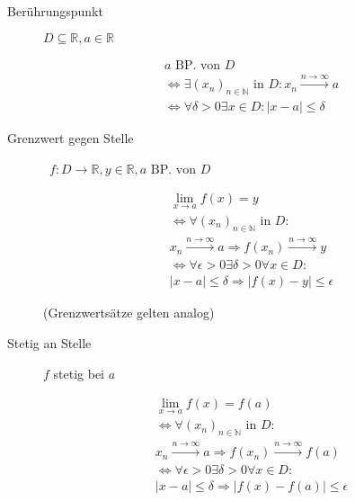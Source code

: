 \begin{description}
  \item [Berührungspunkt]
        $D \subseteq \mathbb{R}, a \in \mathbb{R}$

        \begin{gather*}
          a \text{ BP. von } D \\
          \Leftrightarrow \exists (x_n)_{n \in \mathbb{N}} \text{ in } D: x_n \xrightarrow{n \rightarrow \infty} a \\
          \Leftrightarrow \forall \delta > 0 \exists x \in D: |x - a| \leq \delta
        \end{gather*}

  \item [Grenzwert gegen Stelle]
        \
        $f: D \rightarrow \mathbb{R}, y \in \mathbb{R}, a \text{ BP. von } D$

        \begin{gather*}
          \lim_{x \rightarrow a} f(x) = y \\
          \Leftrightarrow \forall (x_n)_{n \in \mathbb{N}} \text{ in } D: \\ x_n \xrightarrow{n \rightarrow \infty} a \Rightarrow f(x_n) \xrightarrow{n \rightarrow \infty} y \\
          \Leftrightarrow \forall \epsilon > 0 \exists \delta > 0 \forall x \in D: \\
          |x - a| \leq \delta \Rightarrow |f(x) - y| \leq \epsilon
        \end{gather*}

        (Grenzwertsätze gelten analog)

  \item [Stetig an Stelle] $f$ stetig bei $a$

        \begin{gather*}
          \lim_{x \rightarrow a} f(x) = f(a) \\
          \Leftrightarrow \forall (x_n)_{n \in \mathbb{N}} \text{ in } D: \\ x_n \xrightarrow{n \rightarrow \infty} a \Rightarrow f(x_n) \xrightarrow{n \rightarrow \infty} f(a) \\
          \Leftrightarrow \forall \epsilon > 0 \exists \delta > 0 \forall x \in D: \\
          |x - a| \leq \delta \Rightarrow |f(x) - f(a)| \leq \epsilon
        \end{gather*}


\end{description}
